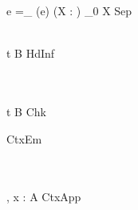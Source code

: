 \Rule{\SeparationRule}
    {
        \Gamma \vdash e \chck {} =_{} 
    }
    {\Gamma \vdash \delta(e) \infr (X : \star) \to_0 X}
    {Sep}

\Rule{\HeadInferenceRule}
    {
         \\
    }
    {\Gamma \vdash t \cinfr B}
    {HdInf}

\Rule{\CheckRule}
    {
         \\
         \\
    }  
    {\Gamma \vdash t \chck B}
    {Chk}

\Rule{\ContextEmptyRule}
    {\color{white}{\_}}
    {\vdash \varepsilon}
    {CtxEm}

\Rule{\ContextAppendRule}
    {
         \\
         \\
    }
    {\vdash \Gamma, x : A}
    {CtxApp}
